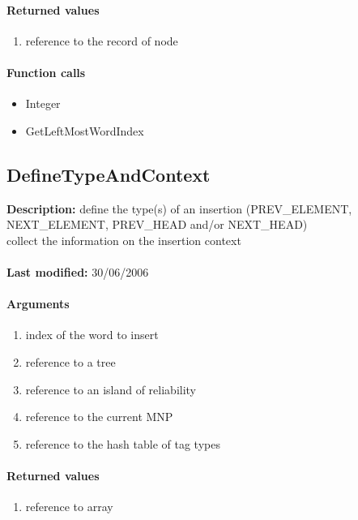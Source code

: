 \paragraph{Returned values}
\begin{enumerate}
\item reference to the record of node
\end{enumerate}

\paragraph{Function calls}
\begin{itemize}
\item Integer
\item GetLeftMostWordIndex
\end{itemize}

\subsection{DefineTypeAndContext}
\textbf{Description:} define the type(s) of an insertion (PREV\_ELEMENT, NEXT\_ELEMENT, PREV\_HEAD and/or NEXT\_HEAD)\\
collect the information on the insertion context\\
\\\textbf{Last modified:} 30/06/2006

\paragraph{Arguments}
\begin{enumerate}
\item index of the word to insert
\item reference to a tree
\item reference to an island of reliability
\item reference to the current MNP
\item reference to the hash table of tag types
\end{enumerate}

\paragraph{Returned values}
\begin{enumerate}
\item reference to array
\end{enumerate}

